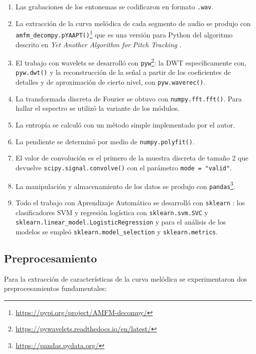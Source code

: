 \begin{enumerate}
\item Las grabaciones de los entonemas se codificaron en formato \texttt{.wav}.

\item La extracci\'on de la curva mel\'odica de cada segmento de audio se produjo con \texttt{amfm\_decompy.pYAAPT()}\footnote{\url{https://pypi.org/project/AMFM-decompy/}} que es una versi\'on para Python del algoritmo descrito en \emph{Yet Another Algorithm for Pitch Tracking} \cite{kasi2002yet}.

\item El trabajo con wavelets se desarroll\'o con \texttt{pyw}\footnote{\url{https://pywavelets.readthedocs.io/en/latest/}}: la DWT espec\'ificamente con, \texttt{pyw.dwt()} y la reconstrucci\'on de la se\~nal a partir de los coeficientes de detalles y de aproximaci\'on de cierto nivel, con \texttt{pyw.waverec()}.

\item La transformada discreta de Fourier se obtuvo con \texttt{numpy.fft.fft()}. Para hallar el espectro se utiliz\'o la variante de los m\'odulos.

\item La entrop\'ia se calcul\'o con un m\'etodo simple implementado por el autor.

\item La pendiente se determin\'o por medio de \texttt{numpy.polyfit()}.

\item El valor de convoluci\'on es el primero de la muestra discreta de tama\~no 2 que devuelve \texttt{scipy.signal.convolve()} con el par\'ametro \texttt{mode = "valid"}.

\item La manipulaci\'on y almacenamiento de los datos se produjo con \texttt{pandas}\footnote{\url{https://pandas.pydata.org/}}.

\item Todo el trabajo con Aprendizaje Autom\'atico se desarroll\'o con \texttt{sklearn} \cite{garreta2013learning}: los clasificadores SVM y regresi\'on log\'istica con \texttt{sklearn.svm.SVC} y \texttt{sklearn.linear\_model.LogisticRegression} y para el an\'alisis de los modelos se emple\'o \texttt{sklearn.model\_selection} y \texttt{sklearn.metrics}. 
\end{enumerate}






\subsection{Preprocesamiento}
Para la extracci\'on de caracter\'isticas de la curva mel\'odica se experimentaron dos preprocesamientos fundamentales:


